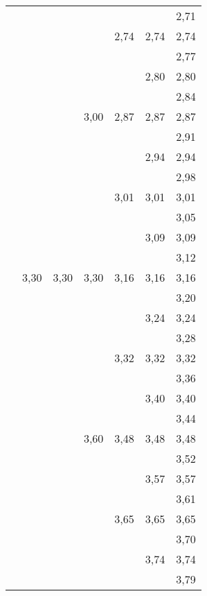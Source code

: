 \begin{tiny}
\begin{tabular}{@{}c@{ }c@{ }c@{ }c@{ }c@{ }c@{ }c}
     &      &      &      &      &      & 2,71 \\
     &      &      &      & 2,74 & 2,74 & 2,74 \\
     &      &      &      &      &      & 2,77 \\
     &      &      &      &      & 2,80 & 2,80 \\
     &      &      &      &      &      & 2,84 \\
     &      &      & 3,00 & 2,87 & 2,87 & 2,87 \\
     &      &      &      &      &      & 2,91 \\
     &      &      &      &      & 2,94 & 2,94 \\
     &      &      &      &      &      & 2,98 \\
     &      &      &      & 3,01 & 3,01 & 3,01 \\
     &      &      &      &      &      & 3,05 \\
     &      &      &      &      & 3,09 & 3,09 \\
     &      &      &      &      &      & 3,12 \\
     & 3,30 & 3,30 & 3,30 & 3,16 & 3,16 & 3,16 \\
     &      &      &      &      &      & 3,20 \\
     &      &      &      &      & 3,24 & 3,24 \\
     &      &      &      &      &      & 3,28 \\
     &      &      &      & 3,32 & 3,32 & 3,32 \\
     &      &      &      &      &      & 3,36 \\
     &      &      &      &      & 3,40 & 3,40 \\
     &      &      &      &      &      & 3,44 \\
     &      &      & 3,60 & 3,48 & 3,48 & 3,48 \\
     &      &      &      &      &      & 3,52 \\
     &      &      &      &      & 3,57 & 3,57 \\
     &      &      &      &      &      & 3,61 \\
     &      &      &      & 3,65 & 3,65 & 3,65 \\
     &      &      &      &      &      & 3,70 \\
     &      &      &      &      & 3,74 & 3,74 \\
     &      &      &      &      &      & 3,79 \\

\end{tabular}
\end{tiny}
